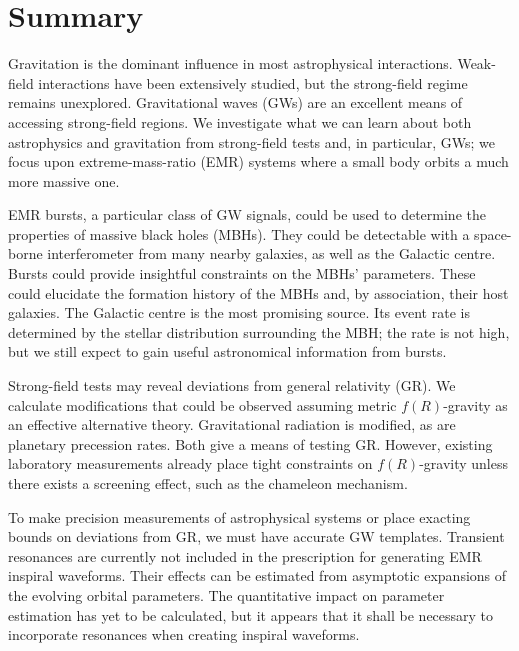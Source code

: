 \chapter*{Summary}
\label{summary}

Gravitation is the dominant influence in most astrophysical interactions. Weak-field interactions have been extensively studied, but the strong-field regime remains unexplored. Gravitational waves (GWs) are an excellent means of accessing strong-field regions. We investigate what we can learn about both astrophysics and gravitation from strong-field tests and, in particular, GWs; we focus upon extreme-mass-ratio (EMR) systems where a small body orbits a much more massive one.

EMR bursts, a particular class of GW signals, could be used to determine the properties of massive black holes (MBHs). They could be detectable with a space-borne interferometer from many nearby galaxies, as well as the Galactic centre. Bursts could provide insightful constraints on the MBHs' parameters. These could elucidate the formation history of the MBHs and, by association, their host galaxies. The Galactic centre is the most promising source. Its event rate is determined by the stellar distribution surrounding the MBH; the rate is not high, but we still expect to gain useful astronomical information from bursts.

Strong-field tests may reveal deviations from general relativity (GR). We calculate modifications that could be observed assuming metric $f(R)$-gravity as an effective alternative theory. Gravitational radiation is modified, as are planetary precession rates. Both give a means of testing GR. However, existing laboratory measurements already place tight constraints on $f(R)$-gravity unless there exists a screening effect, such as the chameleon mechanism.

To make precision measurements of astrophysical systems or place exacting bounds on deviations from GR, we must have accurate GW templates. Transient resonances are currently not included in the prescription for generating EMR inspiral waveforms. Their effects can be estimated from asymptotic expansions of the evolving orbital parameters. The quantitative impact on parameter estimation has yet to be calculated, but it appears that it shall be necessary to incorporate resonances when creating inspiral waveforms.
